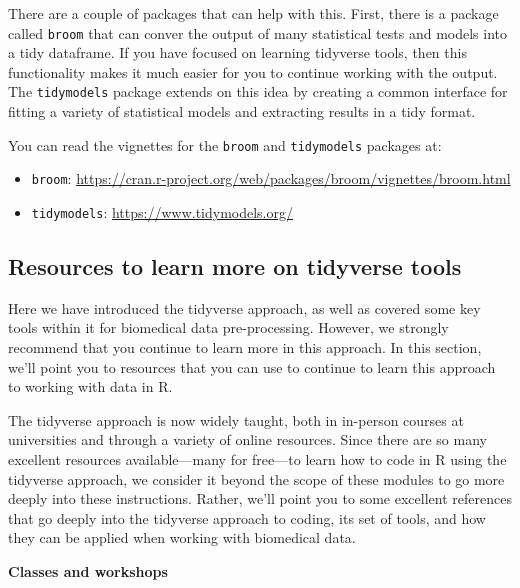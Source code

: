 \documentclass[]{tufte-book}
\providecommand{\tightlist}{%
  \setlength{\itemsep}{0pt}\setlength{\parskip}{0pt}}
\begin{document}
There are a couple of packages that can help with this. First, there is a
package called \texttt{broom} that can conver the output of many statistical
tests and models into a tidy dataframe. If you have focused on learning
tidyverse tools, then this functionality makes it much easier for you to
continue working with the output. The \texttt{tidymodels}
package extends on this idea by creating a common interface for fitting
a variety of statistical models and extracting results in a tidy format.

You can read the vignettes for the \texttt{broom} and \texttt{tidymodels} packages at:

\begin{itemize}
\tightlist
\item
  \texttt{broom}: \url{https://cran.r-project.org/web/packages/broom/vignettes/broom.html}
\item
  \texttt{tidymodels}: \url{https://www.tidymodels.org/}
\end{itemize}

\subsection{Resources to learn more on tidyverse tools}\label{resources-to-learn-more-on-tidyverse-tools}

Here we have introduced the tidyverse approach, as well as covered some key
tools within it for biomedical data pre-processing. However, we strongly
recommend that you continue to learn more in this approach. In this section,
we'll point you to resources that you can use to continue to learn this approach
to working with data in R.

The tidyverse approach is now widely taught, both in in-person courses at
universities and through a variety of online resources.
Since there are so many excellent resources available---many for free---to learn
how to code in R using the tidyverse approach, we consider it beyond the scope
of these modules to go more deeply into these instructions. Rather, we'll
point you to some excellent references that go deeply into the tidyverse
approach to coding, its set of tools, and how they can be applied when
working with biomedical data.

\textbf{Classes and workshops}
\end{document}
